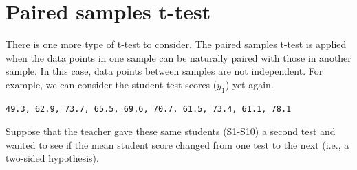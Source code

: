 \documentclass[
  openany]{krantz}
\begin{document}
\hypertarget{paired-samples-t-test}{%
\section{Paired samples t-test}\label{paired-samples-t-test}}

There is one more type of t-test to consider.
The paired samples t-test is applied when the data points in one sample can be naturally paired with those in another sample.
In this case, data points between samples are not independent.
For example, we can consider the student test scores (\(y_{1}\)) yet again.

\begin{verbatim}
49.3, 62.9, 73.7, 65.5, 69.6, 70.7, 61.5, 73.4, 61.1, 78.1
\end{verbatim}

Suppose that the teacher gave these same students (S1-S10) a second test and wanted to see if the mean student score changed from one test to the next (i.e., a two-sided hypothesis).
\end{document}
